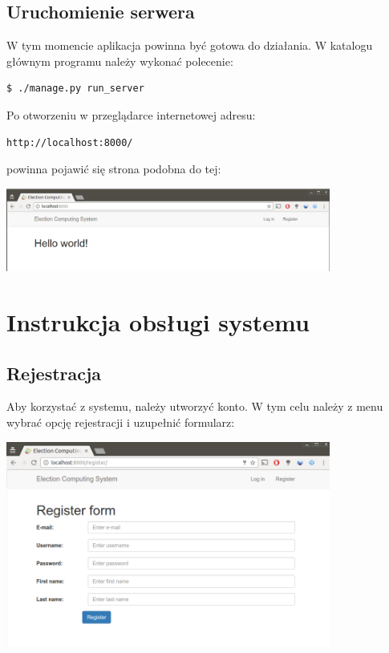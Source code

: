 \documentclass[pdflatex,11pt]{../aghdoc}
\begin{document}
\section{Uruchomienie serwera}
\label{sec:serwer}

W tym momencie aplikacja powinna być gotowa do działania.
W katalogu głównym programu należy wykonać polecenie:
\begin{lstlisting}[language=bash]
$ ./manage.py run_server
\end{lstlisting}

Po otworzeniu w przeglądarce internetowej adresu:
\begin{lstlisting}
http://localhost:8000/
\end{lstlisting}
powinna pojawić się strona podobna do tej:


\includegraphics[width=0.8\textwidth]{pics/first_view.png}


\chapter{Instrukcja obsługi systemu}
\label{cha:obsluga}


\section{Rejestracja}
\label{sec:rejestracja}

Aby korzystać z systemu, należy utworzyć konto. W tym celu należy z menu wybrać opcję rejestracji i uzupełnić formularz:

\includegraphics[width=0.8\textwidth]{pics/register.png}
\end{document}
